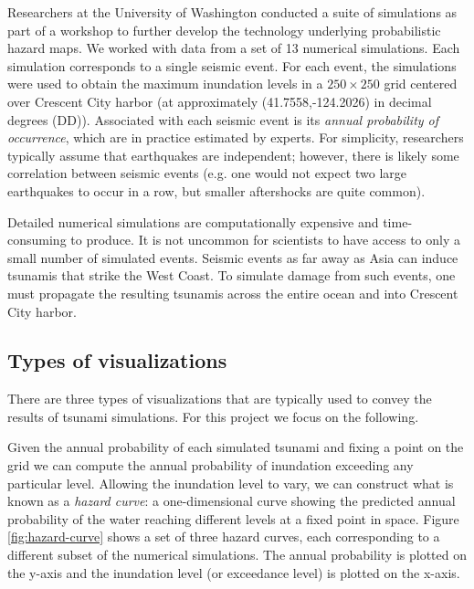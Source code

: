 \documentclass{vgtc}                          %
\begin{document}
Researchers at the University of Washington conducted a suite of simulations as part of a workshop to further develop the technology underlying probabilistic hazard maps. We worked with data from a set of 13 numerical simulations. Each simulation corresponds to a single seismic event. For each event, the simulations were used to obtain the maximum inundation levels in a $250\times250$ grid centered over Crescent City harbor (at approximately (41.7558,-124.2026) in decimal degrees (DD)). Associated with each seismic event is its \emph{annual probability of occurrence}, which are in practice estimated by experts. For simplicity, researchers typically assume that earthquakes are independent; however, there is likely some correlation between seismic events (e.g. one would not expect two large earthquakes to occur in a row, but smaller aftershocks are quite common).

Detailed numerical simulations are computationally expensive and time-consuming to produce.
It is not uncommon for scientists to have access to only a small number of simulated events. Seismic events as far away as Asia can induce tsunamis that strike the West Coast. To simulate damage from such events, one must propagate the resulting tsunamis across the entire ocean and into Crescent City harbor. %

\subsection{Types of visualizations}

There are three types of visualizations that are typically used to convey the results of tsunami simulations. For this project we focus on the following.

Given the annual probability of each simulated tsunami and fixing a point on the grid we can compute the annual probability of inundation exceeding any particular level. Allowing the inundation level to vary, we can construct what is known as a \emph{hazard curve}: a one-dimensional curve showing the predicted annual probability of the water reaching different levels at a fixed point in space. Figure \ref{fig:hazard-curve} shows a set of three hazard curves, each corresponding to a different subset of the numerical simulations. The annual probability is plotted on the y-axis and the inundation level (or exceedance level) is plotted on the x-axis.
\end{document}
